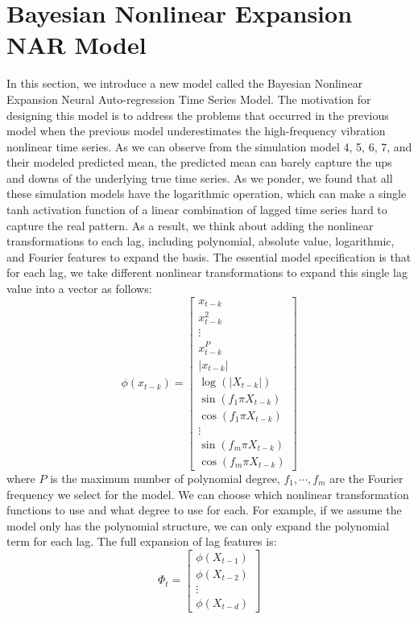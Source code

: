 \documentclass{article}
\begin{document}
\section{Bayesian Nonlinear Expansion NAR Model}
In this section, we introduce a new model called the Bayesian Nonlinear Expansion Neural Auto-regression Time Series Model. The motivation for designing this model is to address the problems that occurred in the previous model when the previous model underestimates the high-frequency vibration nonlinear time series. As we can observe from the simulation model 4, 5, 6, 7, and their modeled predicted mean, the predicted mean can barely capture the ups and downs of the underlying true time series. As we ponder, we found that all these simulation models have the logarithmic operation, which can make a single tanh activation function of a linear combination of lagged time series hard to capture the real pattern. As a result, we think about adding the nonlinear transformations to each lag, including polynomial, absolute value, logarithmic, and Fourier features to expand the basis. The essential model specification is that for each lag, we take different nonlinear transformations to expand this single lag value into a vector as follows:
$$
\phi\left(x_{t-k}\right)=\left[\begin{array}{c}
x_{t-k} \\
x_{t-k}^2 \\
\vdots \\
x_{t-k}^P \\
\left|x_{t-k}\right| \\
\log \left(\left|X_{t-k}\right|\right) \\
\sin \left(f_1 \pi X_{t-k}\right) \\
\cos \left(f_1 \pi X_{t-k}\right) \\
\vdots \\
\sin \left(f_m \pi X_{t-k}\right) \\
\cos \left(f_m \pi X_{t-k}\right)
\end{array}\right]
$$ where $P$ is the maximum number of polynomial degree, $f_1,\cdots,f_m$ are the Fourier frequency we select for the model. We can choose which nonlinear transformation functions to use and what degree to use for each. For example, if we assume the model only has the polynomial structure, we can only expand the polynomial term for each lag. The full expansion of lag features is: 
$$\Phi_t=\left[\begin{array}{c}
\phi\left(X_{t-1}\right) \\
\phi\left(X_{t-2}\right) \\
\vdots \\
\phi\left(X_{t-d}\right)
\end{array}\right]$$
\end{document}
